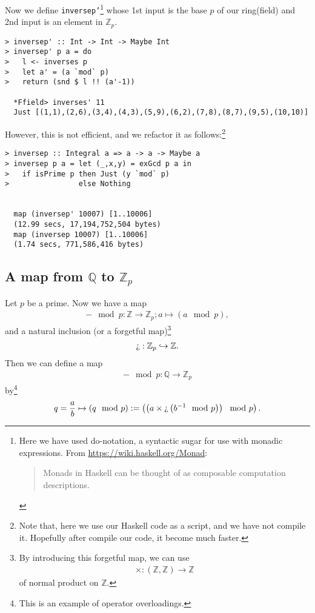 \documentclass[11pt]{book}
\begin{document}
Now we define \texttt{inversep'}\footnote{
Here we have used do-notation, a syntactic sugar for use with monadic expressions.
From \url{https://wiki.haskell.org/Monad}:
\begin{quotation}
Monads in Haskell can be thought of as composable computation descriptions.
\end{quotation}
} whose 1st input is the base $p$ of our ring(field) and 2nd input is an element in $\mathbb{Z}_p$.
\begin{verbatim}
> inversep' :: Int -> Int -> Maybe Int
> inversep' p a = do
>   l <- inverses p
>   let a' = (a `mod` p)
>   return (snd $ l !! (a'-1)) 
   
  *Ffield> inverses' 11
  Just [(1,1),(2,6),(3,4),(4,3),(5,9),(6,2),(7,8),(8,7),(9,5),(10,10)]
\end{verbatim}
However, this is not efficient, and we refactor it as follows:\footnote{
Note that, here we use our Haskell code as a script, and we have not compile it.
Hopefully after compile our code, it become much faster.
}
\begin{verbatim}
> inversep :: Integral a => a -> a -> Maybe a
> inversep p a = let (_,x,y) = exGcd p a in
>   if isPrime p then Just (y `mod` p)
>                else Nothing


  map (inversep' 10007) [1..10006]
  (12.99 secs, 17,194,752,504 bytes)
  map (inversep 10007) [1..10006]
  (1.74 secs, 771,586,416 bytes)
\end{verbatim}


\subsection{A map from $\mathbb{Q}$ to $\mathbb{Z}_p$}
Let $p$ be a prime.
Now we have a map
\begin{eqnarray}
- \mod p : \mathbb{Z} \to \mathbb{Z}_p; a \mapsto (a \mod p),
\end{eqnarray}
and a natural inclusion (or a forgetful map)\footnote{
By introducing this forgetful map, we can use 
\begin{eqnarray}
\times : (\mathbb{Z}, \mathbb{Z}) \to \mathbb{Z} 
\end{eqnarray}
of normal product on $\mathbb{Z}$.
}
\begin{eqnarray}
\text{\textquestiondown} : \mathbb{Z}_p \hookrightarrow \mathbb{Z}.
\end{eqnarray}
Then we can define a map
\begin{eqnarray}
- \mod p : \mathbb{Q} \to \mathbb{Z}_p
\end{eqnarray}
by\footnote{
This is an example of operator overloadings.
}
\begin{eqnarray}
q = \frac{a}{b} \mapsto (q \mod p) := \left( \left( a \times \text{\textquestiondown} \left( b^{-1} \mod p\right) \right) \mod p \right).
\end{eqnarray}
\end{document}
